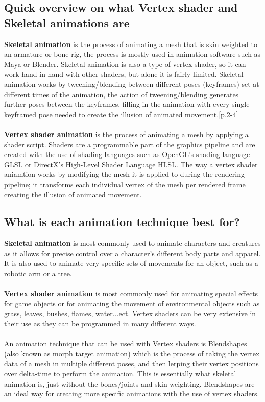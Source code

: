 \documentclass{scrartcl}
\begin{document}
\subsection{Quick overview on what Vertex shader and Skeletal animations are}
\textbf{Skeletal animation} is the process of animating a mesh that is skin weighted to an armature or bone rig, the process is mostly used in animation software such as Maya or Blender.
Skeletal animation is also a type of vertex shader, so it can work hand in hand with other shaders, but alone it is fairly limited.\cite{one}\cite{five}
Skeletal animation works by tweening/blending between different poses (keyframes) set at different times of the animation, the action of tweening/blending generates further poses between the keyframes, filling in the animation with every single keyframed pose needed to create the illusion of animated movement.\cite{ten}[p.2-4]
\\~\\
\textbf{Vertex shader animation} is the process of animating a mesh by applying a shader script. Shaders are a programmable part of the graphics pipeline and are created with the use of shading languages such as OpenGL's shading language GLSL or DirectX's High-Level Shader Language HLSL.
The way a vertex shader aniamtion works by modifying the mesh it is applied to during the rendering pipeline; it transforms each individual vertex of the mesh per rendered frame creating the illusion of animated movement.\cite{one}\cite{twelve}\cite{nine}\cite{fithteen}

\subsection{What is each animation technique best for?}
\textbf{Skeletal animation} is most commonly used to animate characters and creatures as it allows for precise control over a character's different body parts and apparel. It is also used to animate very specific sets of movements for an object, such as a robotic arm or a tree.\cite{ten}
\\~\\
\textbf{Vertex shader animation} is most commonly used for animating special effects for game objects or for animating the movement of environmental objects such as grass, leaves, bushes, flames, water...ect.\cite{two}\cite{three}\cite{four}\cite{six}\cite{sixteen}\cite{eleven}
Vertex shaders can be very extensive in their use as they can be programmed in many different ways.
\\~\\
An animation technique that can be used with Vertex shaders is Blendshapes (also known as morph target animation) which is the process of taking the vertex data of a mesh in multiple different poses, and then lerping their vertex positions over delta-time to perform the animation. This is essentially what skeletal animation is, just without the bones/joints and skin weighting.
Blendshapes are an ideal way for creating more specific animations with the use of vertex shaders.\cite{fourteen}
\end{document}
